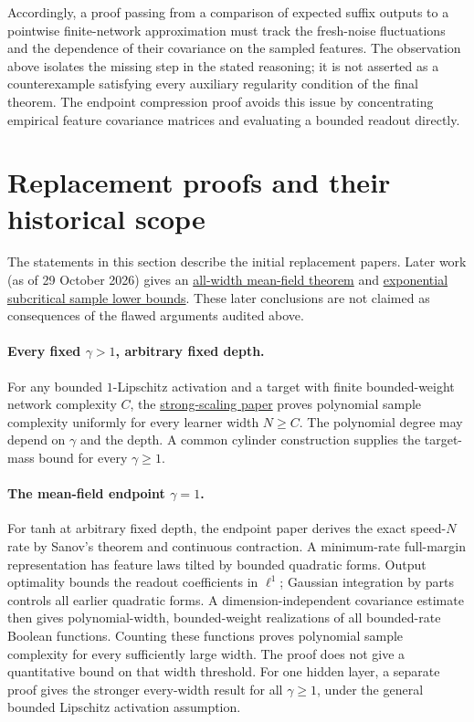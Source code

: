 \documentclass[11pt]{article}
\begin{document}
Accordingly, a proof passing from a comparison of expected suffix outputs to a pointwise finite-network approximation must track the fresh-noise fluctuations and the dependence of their covariance on the sampled features. The observation above isolates the missing step in the stated reasoning; it is not asserted as a counterexample satisfying every auxiliary regularity condition of the final theorem. The endpoint compression proof avoids this issue by concentrating empirical feature covariance matrices and evaluating a bounded readout directly.

\section{Replacement proofs and their historical scope}
The statements in this section describe the initial replacement papers.
Later work (as of 29 October 2026) gives an
\href{https://github.com/kaarelh/AI-works/blob/main/neural-network-generalization/main-results/meanfield-all-width/paper.pdf}{all-width mean-field theorem} and \href{https://github.com/kaarelh/AI-works/blob/main/neural-network-generalization/main-results/subcritical-exponential/paper.pdf}{exponential subcritical sample lower bounds}. These later conclusions are not claimed as consequences of the flawed arguments audited above.
\paragraph{Every fixed $\gamma>1$, arbitrary fixed depth.}
For any bounded $1$-Lipschitz activation and a target with finite bounded-weight network complexity $C$, the \href{https://github.com/kaarelh/AI-works/blob/main/neural-network-generalization/main-results/gamma-above-one/paper.pdf}{strong-scaling paper} proves polynomial sample complexity uniformly for every learner width $N\geq C$. The polynomial degree may depend on $\gamma$ and the depth. A common cylinder construction supplies the target-mass bound for every $\gamma\geq1$.

\paragraph{The mean-field endpoint $\gamma=1$.}
For tanh at arbitrary fixed depth, the endpoint paper derives the exact speed-$N$ rate by Sanov's theorem and continuous contraction. A minimum-rate full-margin representation has feature laws tilted by bounded quadratic forms. Output optimality bounds the readout coefficients in $\ell^1$; Gaussian integration by parts controls all earlier quadratic forms. A dimension-independent covariance estimate then gives polynomial-width, bounded-weight realizations of all bounded-rate Boolean functions. Counting these functions proves polynomial sample complexity for every sufficiently large width. The proof does not give a quantitative bound on that width threshold. For one hidden layer, a separate proof gives the stronger every-width result for all $\gamma\geq1$, under the general bounded Lipschitz activation assumption.
\end{document}

